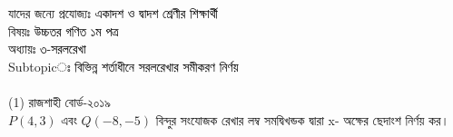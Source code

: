 \documentclass{article}
\begin{document}
 
	\Large
	যাদের জন্যে প্রযোজ্যঃ  	\textcolor{black}{একাদশ ও দ্বাদশ শ্রেণীর শিক্ষার্থী} \\
বিষয়ঃ \textcolor{black}{উচ্চতর গণিত ১ম পত্র} \\
অধ্যায়ঃ \textcolor{black}{৩-সরলরেখা }\\ 
Subtopicঃ \textcolor{black}{বিভিন্ন শর্তাধীনে সরলরেখার সমীকরণ নির্ণয় }\\	
\\
(1) রাজশাহী বোর্ড-২০১৯\\
$P(4,3)$ এবং  $Q(-8,-5)$ বিন্দুর সংযোজক রেখার লম্ব সমদ্বিখন্ডক দ্বারা  x-  অক্ষের ছেদাংশ নির্ণয় কর।  
\end{document}

